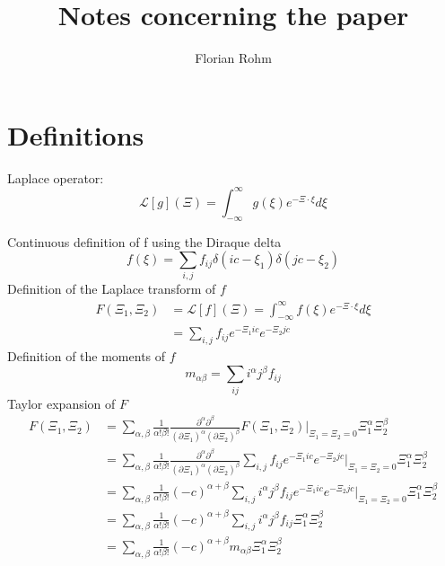 \documentclass{article}
\title{Notes concerning the paper}
\author{Florian Rohm}
\begin{document}
\maketitle

\begin{abstract}
\end{abstract}

\section{Definitions}
\label{sec:Definitions}

Laplace operator:
\begin{equation}
  \label{eq:Definition of Laplace}
  \mathcal{L}[g](\Xi) = \int_{-\infty}^\infty g(\xi) e^{-\Xi \cdot \xi}d\xi
\end{equation}

Continuous definition of f using the Diraque delta
\begin{equation}
  \label{eq:Definition of f xi}
  f(\xi) = \sum_{i,j} f_{ij}\delta(ic - \xi_1)\delta(jc - \xi_2)
\end{equation}
Definition of the Laplace transform of $f$
\begin{equation}
  \label{eq:Definition of F}
  \begin{aligned}
    F(\Xi_1, \Xi_2) & = \mathcal{L}[f](\Xi) = \int_{-\infty}^\infty f(\xi) e^{-\Xi \cdot \xi}d\xi \\
     & = \sum_{i,j}f_{ij} e^{-\Xi_1 ic} e^{-\Xi_2 jc}
  \end{aligned}
\end{equation}
Definition of the moments of $f$
\begin{equation}
  \label{eq:Definition of moments}
  m_{\alpha\beta} = \sum_{ij} i^\alpha j^\beta f_{ij}
\end{equation}
Taylor expansion of $F$
\begin{equation}
  \label{eq: taylor of F}
  \begin{aligned}
    F(\Xi_1, \Xi_2) & = \sum_{\alpha,\beta} \frac{1}{\alpha!\beta!} \frac{\partial^\alpha\partial^\beta}{{(\partial \Xi_1)}^\alpha{(\partial \Xi_2)}^\beta} F(\Xi_1, \Xi_2)\Bigr|_{\Xi_1=\Xi_2 = 0} \Xi_1^\alpha \Xi_2^\beta \\
    & = \sum_{\alpha,\beta} \frac{1}{\alpha!\beta!} \frac{\partial^\alpha\partial^\beta}
      {{(\partial \Xi_1)}^\alpha{(\partial \Xi_2)}^\beta}  \sum_{i,j}f_{ij} e^{-\Xi_1 ic} e^{-\Xi_2 jc} \Bigr|_{\Xi_1=\Xi_2 = 0} \Xi_1^\alpha \Xi_2^\beta \\
    & = \sum_{\alpha,\beta} \frac{1}{\alpha!\beta!} {(-c)}^{\alpha+\beta}  \sum_{i,j} i^\alpha j^\beta f_{ij} e^{-\Xi_1 ic} e^{-\Xi_2 jc} \Bigr|_{\Xi_1=\Xi_2 = 0} \Xi_1^\alpha \Xi_2^\beta \\
    & = \sum_{\alpha,\beta} \frac{1}{\alpha!\beta!} {(-c)}^{\alpha+\beta}  \sum_{i,j} i^\alpha j^\beta f_{ij} \Xi_1^\alpha \Xi_2^\beta \\
    & = \sum_{\alpha,\beta} \frac{1}{\alpha!\beta!} {(-c)}^{\alpha+\beta}  m_{\alpha\beta} \Xi_1^\alpha \Xi_2^\beta
  \end{aligned}
\end{equation}
\end{document}
